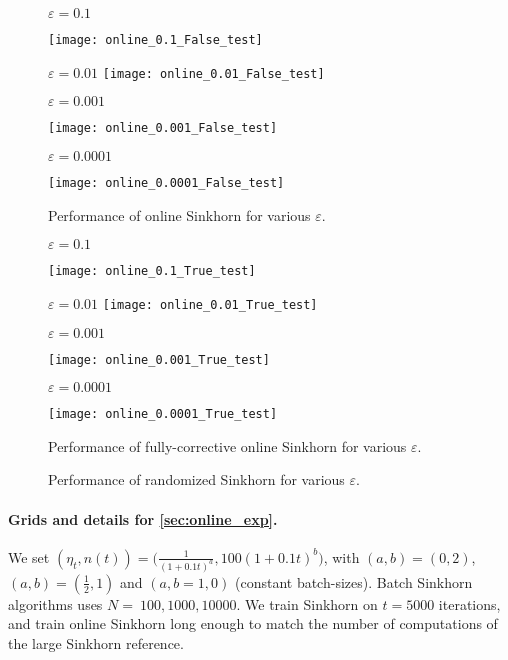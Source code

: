 \begin{figure}[t]
    \centering
    $\varepsilon = 0.1$

    \texttt{[image: online\_0.1\_False\_test]}
    
    $\varepsilon = 0.01$
    \texttt{[image: online\_0.01\_False\_test]}

    $\varepsilon = 0.001$

    \texttt{[image: online\_0.001\_False\_test]}

    $\varepsilon = 0.0001$

    \texttt{[image: online\_0.0001\_False\_test]}
    \caption{Performance of online Sinkhorn for various $\varepsilon$.}
    \label{fig:convergence_all}
\end{figure}

\begin{figure}[t]
    \centering
    $\varepsilon = 0.1$

    \texttt{[image: online\_0.1\_True\_test]}
    
    $\varepsilon = 0.01$
    \texttt{[image: online\_0.01\_True\_test]}

    $\varepsilon = 0.001$

    \texttt{[image: online\_0.001\_True\_test]}

    $\varepsilon = 0.0001$

    \texttt{[image: online\_0.0001\_True\_test]}
    \caption{Performance of fully-corrective online Sinkhorn for various $\varepsilon$.}
    \label{fig:convergence_refit}
\end{figure}

\begin{figure}[t]
    \centering

    \caption{Performance of randomized Sinkhorn for various $\varepsilon$.}
    \label{fig:convergence_randomized}
\end{figure}



\paragraph{Grids and details for \autoref{sec:online_exp}.} We set $(\eta_t,
n(t)) = \big(\frac{1}{(1 + 0.1t)^a}, 100 (1 + 0.1t)^{b}\big)$, with $(a, b) =
(0, 2)$, $(a, b) = (\frac{1}{2}, 1)$ and $(a,b =1, 0)$ (constant batch-sizes).
Batch Sinkhorn algorithms uses $N=~100,1000,10000$. We train Sinkhorn on $t =
5000$ iterations, and train online Sinkhorn long enough to match the number of
computations of the large Sinkhorn reference. 

